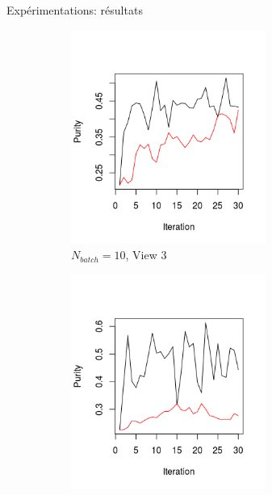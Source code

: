 \documentclass[hyperref={pdfpagelabels=false}]{beamer}
\begin{document}
        \begin{frame}{Expérimentations: résultats}
            \begin{figure}[!h]
                \centering
                \begin{subfigure}[b]{0.3\textwidth}
                    \centering
                    \includegraphics[width=0.7\textwidth, trim= 0cm 0.5cm 1cm 2cm, clip]{img/33.png}
                    \caption{$N_{batch}=10$, View 3}
                \end{subfigure}
                \begin{subfigure}[b]{0.3\textwidth}
                    \centering
                    \includegraphics[width=0.7\textwidth, trim= 0cm 0.5cm 1cm 2cm, clip]{img/p3.png}

\end{subfigure}
\end{figure}
\end{frame}
\end{document}
